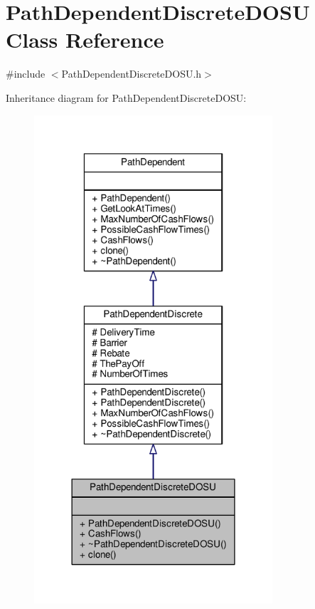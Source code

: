 \hypertarget{classPathDependentDiscreteDOSU}{}\section{Path\+Dependent\+Discrete\+D\+O\+SU Class Reference}
\label{classPathDependentDiscreteDOSU}


{\ttfamily \#include $<$Path\+Dependent\+Discrete\+D\+O\+S\+U.\+h$>$}



Inheritance diagram for Path\+Dependent\+Discrete\+D\+O\+SU\+:
\nopagebreak
\begin{figure}[H]
\begin{center}
\leavevmode
\includegraphics[width=251pt]{classPathDependentDiscreteDOSU__inherit__graph}
\end{center}
\end{figure}


